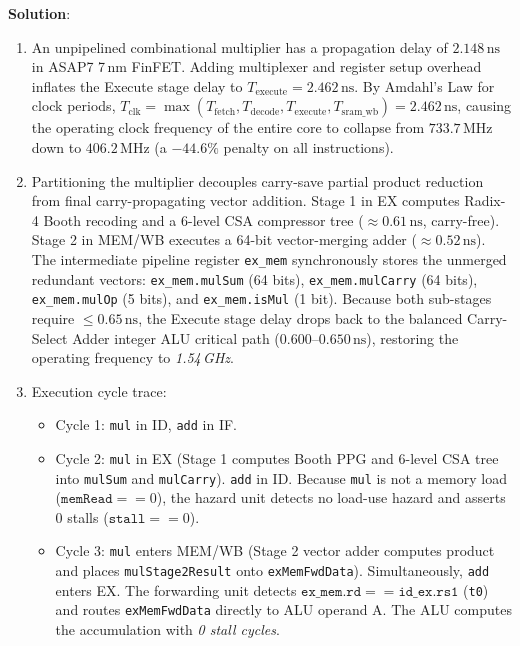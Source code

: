 \begin{problem}
\textbf{Solution}:
\begin{enumerate}
    \item An unpipelined combinational multiplier has a propagation delay of $2.148\,\text{ns}$ in ASAP7 7\,nm FinFET. Adding multiplexer and register setup overhead inflates the Execute stage delay to $T_{\text{execute}} = 2.462\,\text{ns}$. By Amdahl's Law for clock periods, $T_{\text{clk}} = \max(T_{\text{fetch}}, T_{\text{decode}}, T_{\text{execute}}, T_{\text{sram\_wb}}) = 2.462\,\text{ns}$, causing the operating clock frequency of the entire core to collapse from $733.7\,\text{MHz}$ down to $406.2\,\text{MHz}$ (a $-44.6\%$ penalty on all instructions).
    \item Partitioning the multiplier decouples carry-save partial product reduction from final carry-propagating vector addition. Stage 1 in EX computes Radix-4 Booth recoding and a 6-level CSA compressor tree ($\approx 0.61\,\text{ns}$, carry-free). Stage 2 in MEM/WB executes a 64-bit vector-merging adder ($\approx 0.52\,\text{ns}$). The intermediate pipeline register \texttt{ex\_mem} synchronously stores the unmerged redundant vectors: \texttt{ex\_mem.mulSum} (64 bits), \texttt{ex\_mem.mulCarry} (64 bits), \texttt{ex\_mem.mulOp} (5 bits), and \texttt{ex\_mem.isMul} (1 bit). Because both sub-stages require $\le 0.65\,\text{ns}$, the Execute stage delay drops back to the balanced Carry-Select Adder integer ALU critical path ($0.600\text{--}0.650\,\text{ns}$), restoring the operating frequency to \textit{1.54\,GHz}.
    \item Execution cycle trace:
    \begin{itemize}
        \item Cycle 1: \texttt{mul} in ID, \texttt{add} in IF.
        \item Cycle 2: \texttt{mul} in EX (Stage 1 computes Booth PPG and 6-level CSA tree into \texttt{mulSum} and \texttt{mulCarry}). \texttt{add} in ID. Because \texttt{mul} is not a memory load ($\texttt{memRead} == 0$), the hazard unit detects no load-use hazard and asserts 0 stalls ($\texttt{stall} == 0$).
        \item Cycle 3: \texttt{mul} enters MEM/WB (Stage 2 vector adder computes product and places \texttt{mulStage2Result} onto \texttt{exMemFwdData}). Simultaneously, \texttt{add} enters EX. The forwarding unit detects $\texttt{ex\_mem.rd} == \texttt{id\_ex.rs1}$ (\texttt{t0}) and routes \texttt{exMemFwdData} directly to ALU operand A. The ALU computes the accumulation with \textit{0 stall cycles}.
    \end{itemize}

\end{enumerate}
\end{problem}
